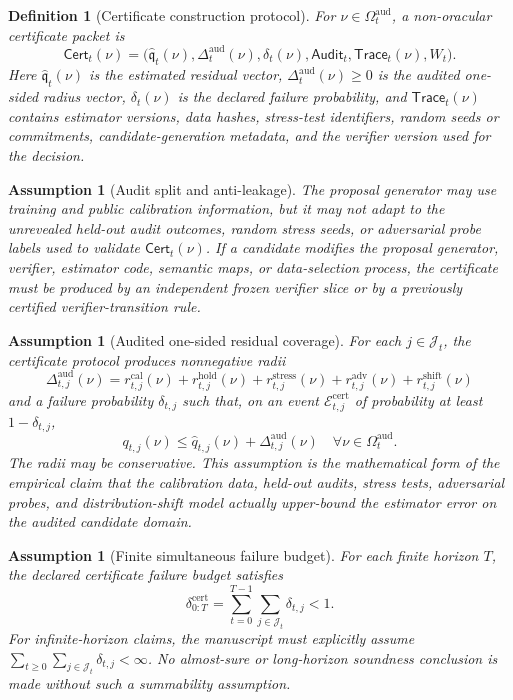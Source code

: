 \documentclass[11pt,a4paper]{article}
\newtheorem{definition}[theorem]{Definition}
\newtheorem{assumption}[theorem]{Assumption}
\newcommand{\Ecal}{\mathcal E}
\newcommand{\calib}{\mathrm{cal}}
\newcommand{\hold}{\mathrm{hold}}
\newcommand{\stress}{\mathrm{stress}}
\newcommand{\adv}{\mathrm{adv}}
\newcommand{\shift}{\mathrm{shift}}
\newcommand{\aud}{\mathrm{aud}}
\newcommand{\cert}{\mathrm{cert}}
\begin{document}
\begin{definition}[Certificate construction protocol]
\label{def:certificate-construction-protocol}
For \(\nu\in\Omega_t^{\aud}\), a non-oracular certificate packet is
\[
\mathsf{Cert}_t(\nu)
=
\bigl(
\widehat{\mathfrak q}_t(\nu),
\Delta_t^{\aud}(\nu),
\delta_t(\nu),
\mathsf{Audit}_t,
\mathsf{Trace}_t(\nu),
W_t
\bigr).
\]
Here \(\widehat{\mathfrak q}_t(\nu)\) is the estimated residual vector, \(\Delta_t^{\aud}(\nu)\ge0\) is the audited one-sided radius vector, \(\delta_t(\nu)\) is the declared failure probability, and \(\mathsf{Trace}_t(\nu)\) contains estimator versions, data hashes, stress-test identifiers, random seeds or commitments, candidate-generation metadata, and the verifier version used for the decision.
\end{definition}

\begin{assumption}[Audit split and anti-leakage]
\label{ass:audit-split-anti-leakage}
The proposal generator may use training and public calibration information, but it may not adapt to the unrevealed held-out audit outcomes, random stress seeds, or adversarial probe labels used to validate \(\mathsf{Cert}_t(\nu)\). If a candidate modifies the proposal generator, verifier, estimator code, semantic maps, or data-selection process, the certificate must be produced by an independent frozen verifier slice or by a previously certified verifier-transition rule.
\end{assumption}

\begin{assumption}[Audited one-sided residual coverage]
\label{ass:audited-one-sided-coverage}
For each \(j\in\mathcal J_t\), the certificate protocol produces nonnegative radii
\[
\Delta_{t,j}^{\aud}(\nu)
= r_{t,j}^{\calib}(\nu)+r_{t,j}^{\hold}(\nu)+r_{t,j}^{\stress}(\nu)+r_{t,j}^{\adv}(\nu)+r_{t,j}^{\shift}(\nu)
\]
and a failure probability \(\delta_{t,j}\) such that, on an event \(\Ecal_{t,j}^{\cert}\) of probability at least \(1-\delta_{t,j}\),
\[
q_{t,j}(\nu)
\le
\widehat q_{t,j}(\nu)+\Delta_{t,j}^{\aud}(\nu)
\quad
\forall \nu\in\Omega_t^{\aud}.
\]
The radii may be conservative. This assumption is the mathematical form of the empirical claim that the calibration data, held-out audits, stress tests, adversarial probes, and distribution-shift model actually upper-bound the estimator error on the audited candidate domain.
\end{assumption}

\begin{assumption}[Finite simultaneous failure budget]
\label{ass:finite-certificate-failure-budget}
For each finite horizon \(T\), the declared certificate failure budget satisfies
\[
\delta_{0:T}^{\cert}
=
\sum_{t=0}^{T-1}\sum_{j\in\mathcal J_t}\delta_{t,j}<1.
\]
For infinite-horizon claims, the manuscript must explicitly assume \(\sum_{t\ge0}\sum_{j\in\mathcal J_t}\delta_{t,j}<\infty\). No almost-sure or long-horizon soundness conclusion is made without such a summability assumption.
\end{assumption}
\end{document}
